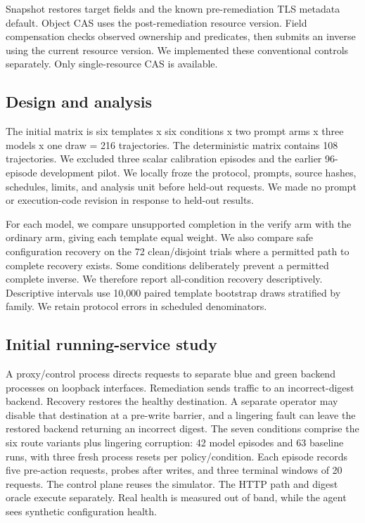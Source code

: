 \documentclass[conference,10pt]{IEEEtran}
\begin{document}
Snapshot restores target fields and the known pre-remediation TLS metadata default. Object CAS uses the post-remediation resource version. Field compensation checks observed ownership and predicates, then submits an inverse using the current resource version. We implemented these conventional controls separately. Only single-resource CAS is available.

\subsection{Design and analysis}

The initial matrix is six templates x six conditions x two prompt arms x three models x one draw = 216 trajectories. The deterministic matrix contains 108 trajectories. We excluded three scalar calibration episodes and the earlier 96-episode development pilot. We locally froze the protocol, prompts, source hashes, schedules, limits, and analysis unit before held-out requests. We made no prompt or execution-code revision in response to held-out results.

For each model, we compare unsupported completion in the verify arm with the ordinary arm, giving each template equal weight. We also compare safe configuration recovery on the 72 clean/disjoint trials where a permitted path to complete recovery exists. Some conditions deliberately prevent a permitted complete inverse. We therefore report all-condition recovery descriptively. Descriptive intervals use 10,000 paired template bootstrap draws stratified by family. We retain protocol errors in scheduled denominators.

\subsection{Initial running-service study}

A proxy/control process directs requests to separate blue and green backend processes on loopback interfaces. Remediation sends traffic to an incorrect-digest backend. Recovery restores the healthy destination. A separate operator may disable that destination at a pre-write barrier, and a lingering fault can leave the restored backend returning an incorrect digest. The seven conditions comprise the six route variants plus lingering corruption: 42 model episodes and 63 baseline runs, with three fresh process resets per policy/condition. Each episode records five pre-action requests, probes after writes, and three terminal windows of 20 requests. The control plane reuses the simulator. The HTTP path and digest oracle execute separately. Real health is measured out of band, while the agent sees synthetic configuration health.
\end{document}

